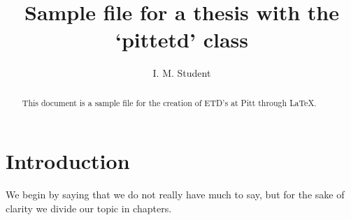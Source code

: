 \documentclass[final]{pittetd}%
\title[A pittetd-thesis sample]{Sample file for a thesis with the `pittetd' class}%
\author{I. M. Student}
\begin{document}
\maketitle
%
\makecommittee
\begin{abstract}
This document is a sample file for the creation of ETD's at Pitt through \LaTeX.
\end{abstract}
\tableofcontents
%
%
\chapter{Introduction}%
We begin by saying that we do not really have much to say, but for the sake of clarity we divide our topic in chapters.
\end{document}
